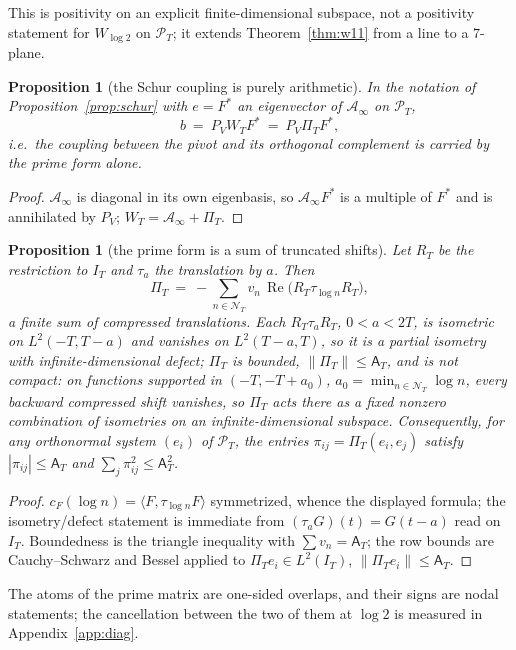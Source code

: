 \documentclass[11pt]{amsart}
\newtheorem{proposition}[theorem]{Proposition}
\theoremstyle{definition}
\theoremstyle{remark}
\newcommand{\Rel}{\operatorname{Re}}
\newcommand{\PT}{\mathcal P_T}
\newcommand{\IT}{I_T}
\newcommand{\cF}{c_F}
\newcommand{\NT}{\mathcal N_T}
\newcommand{\Aconst}{\mathsf A_T}
\newcommand{\Ainf}{\mathcal A_\infty}
\newcommand{\PiT}{\Pi_T}
\begin{document}
This is positivity on an explicit finite-dimensional subspace, not a positivity statement for
$W_{\log2}$ on $\PT$; it extends Theorem~\ref{thm:w11} from a line to a $7$-plane.

\begin{proposition}[the Schur coupling is purely arithmetic]\label{prop:bprime}
In the notation of Proposition~\ref{prop:schur} with $e=F^*$ an eigenvector of $\Ainf$ on $\PT$,
\[
b\ =\ P_VW_TF^*\ =\ P_V\PiT F^* ,
\]
i.e.\ the coupling between the pivot and its orthogonal complement is carried by the prime form alone.
\end{proposition}
\begin{proof}
$\Ainf$ is diagonal in its own eigenbasis, so $\Ainf F^*$ is a multiple of $F^*$ and is annihilated by
$P_V$; $W_T=\Ainf+\PiT$.
\end{proof}

\begin{proposition}[the prime form is a sum of truncated shifts]\label{prop:shifts}
Let $R_T$ be the restriction to $\IT$ and $\tau_a$ the translation by $a$. Then
\[
\PiT\ =\ -\sum_{n\in\NT}v_n\,\Rel\big(R_T\tau_{\log n}R_T\big),
\]
a finite sum of compressed translations. Each $R_T\tau_aR_T$, $0<a<2T$, is isometric on
$L^2(-T,T-a)$ and vanishes on $L^2(T-a,T)$, so it is a partial isometry with
infinite-dimensional defect; $\PiT$ is bounded, $\|\PiT\|\le\Aconst$, and is not compact: on functions
supported in $(-T,-T+a_0)$, $a_0=\min_{n\in\NT}\log n$, every backward compressed shift vanishes, so
$\PiT$ acts there as a fixed nonzero combination of isometries on an infinite-dimensional subspace.
Consequently, for any orthonormal system $(e_i)$ of $\PT$, the entries
$\pi_{ij}=\PiT(e_i,e_j)$ satisfy $|\pi_{ij}|\le\Aconst$ and $\sum_j\pi_{ij}^2\le\Aconst^2$.
\end{proposition}
\begin{proof}
$\cF(\log n)=\langle F,\tau_{\log n}F\rangle$ symmetrized, whence the displayed formula; the
isometry/defect statement is immediate from $(\tau_aG)(t)=G(t-a)$ read on $\IT$. Boundedness is the
triangle inequality with $\sum v_n=\Aconst$; the row bounds are Cauchy--Schwarz and Bessel applied to
$\PiT e_i\in L^2(\IT)$, $\|\PiT e_i\|\le\Aconst$.
\end{proof}

The atoms of the prime matrix are one-sided overlaps, and their signs are nodal statements; the
cancellation between the two of them at $\log2$ is measured in Appendix~\ref{app:diag}.
\end{document}
